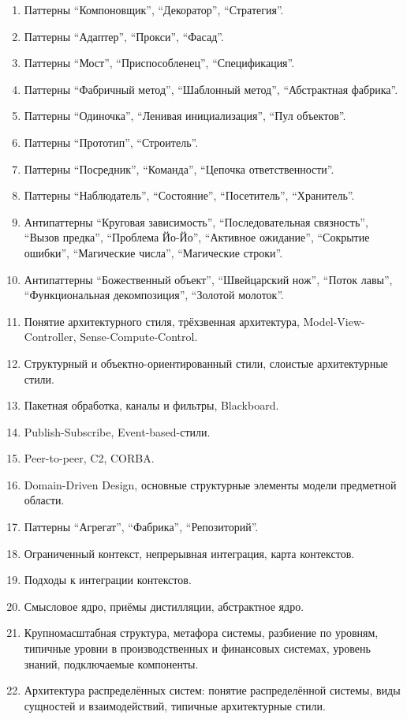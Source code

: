\documentclass[a5paper]{article}
\begin{document}
\begin{enumerate}
	\item Паттерны ``Компоновщик'', ``Декоратор'', ``Стратегия''.
	\item Паттерны ``Адаптер'', ``Прокси'', ``Фасад''.
	\item Паттерны ``Мост'', ``Приспособленец'', ``Спецификация''.
	\item Паттерны ``Фабричный метод'', ``Шаблонный метод'', ``Абстрактная фабрика''.
	\item Паттерны ``Одиночка'', ``Ленивая инициализация'', ``Пул объектов''.
	\item Паттерны ``Прототип'', ``Строитель''.
	\item Паттерны ``Посредник'', ``Команда'', ``Цепочка ответственности''.
	\item Паттерны ``Наблюдатель'', ``Состояние'', ``Посетитель'', ``Хранитель''.
	\item Антипаттерны ``Круговая зависимость'', ``Последовательная связность'', ``Вызов предка'', ``Проблема Йо-Йо'', ``Активное ожидание'', ``Сокрытие ошибки'', ``Магические числа'', ``Магические строки''.
	\item Антипаттерны ``Божественный объект'', ``Швейцарский нож'', ``Поток лавы'', ``Функциональная декомпозиция'', ``Золотой молоток''.
	\item Понятие архитектурного стиля, трёхзвенная архитектура, Model-View-Controller, Sense-Compute-Control.
	\item Структурный и объектно-ориентированный стили, слоистые архитектурные стили.
	\item Пакетная обработка, каналы и фильтры, Blackboard.
	\item Publish-Subscribe, Event-based-стили.
	\item Peer-to-peer, C2, CORBA.
	\item Domain-Driven Design, основные структурные элементы модели предметной области.
	\item Паттерны ``Агрегат'', ``Фабрика'', ``Репозиторий''.
	\item Ограниченный контекст, непрерывная интеграция, карта контекстов.
	\item Подходы к интеграции контекстов.
	\item Смысловое ядро, приёмы дистилляции, абстрактное ядро.
	\item Крупномасштабная структура, метафора системы, разбиение по уровням, типичные уровни в производственных и финансовых системах, уровень знаний, подключаемые компоненты.
	\item Архитектура распределённых систем: понятие распределённой системы, виды сущностей и взаимодействий, типичные архитектурные стили.

\end{enumerate}
\end{document}
